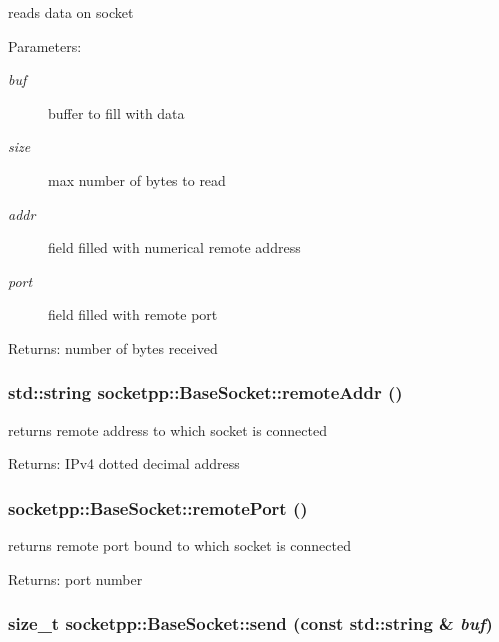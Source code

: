 reads data on socket 

\begin{Desc}
\item[Parameters:]
\begin{description}
\item[{\em buf}]buffer to fill with data \item[{\em size}]max number of bytes to read \item[{\em addr}]field filled with numerical remote address \item[{\em port}]field filled with remote port \end{description}
\end{Desc}
\begin{Desc}
\item[Returns:]number of bytes received \end{Desc}
\hypertarget{classsocketpp_1_1BaseSocket_483c6186ae60d0c399983e14f55af600}{
\subsubsection[{remoteAddr}]{\setlength{\rightskip}{0pt plus 5cm}std::string socketpp::BaseSocket::remoteAddr ()}}
\label{classsocketpp_1_1BaseSocket_483c6186ae60d0c399983e14f55af600}


returns remote address to which socket is connected 

\begin{Desc}
\item[Returns:]IPv4 dotted decimal address \end{Desc}
\hypertarget{classsocketpp_1_1BaseSocket_039db642444d2111f2f58ebe032c5f5f}{
\subsubsection[{remotePort}]{ socketpp::BaseSocket::remotePort ()}}
\label{classsocketpp_1_1BaseSocket_039db642444d2111f2f58ebe032c5f5f}


returns remote port bound to which socket is connected 

\begin{Desc}
\item[Returns:]port number \end{Desc}
\hypertarget{classsocketpp_1_1BaseSocket_fb896f016a243ddbb661acc7b05826bf}{
\subsubsection[{send}]{\setlength{\rightskip}{0pt plus 5cm}size\_\-t socketpp::BaseSocket::send (const std::string \& {\em buf})}}
\label{classsocketpp_1_1BaseSocket_fb896f016a243ddbb661acc7b05826bf}


